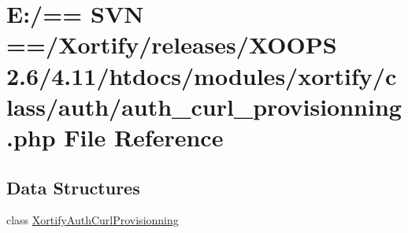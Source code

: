 \hypertarget{auth__curl__provisionning_8php}{\section{E\-:/== S\-V\-N ==/\-Xortify/releases/\-X\-O\-O\-P\-S 2.6/4.11/htdocs/modules/xortify/class/auth/auth\-\_\-curl\-\_\-provisionning.php File Reference}
\label{auth__curl__provisionning_8php}
}
\subsection*{Data Structures}
\begin{DoxyCompactItemize}
\item 
class \hyperlink{class_xortify_auth_curl_provisionning}{Xortify\-Auth\-Curl\-Provisionning}
\end{DoxyCompactItemize}
